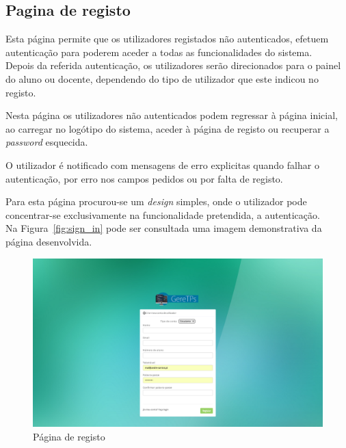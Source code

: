 \subsection{Pagina de registo}

Esta página permite que os utilizadores registados não autenticados, efetuem autenticação para poderem aceder a todas as funcionalidades do sistema.\\

Depois da referida autenticação, os utilizadores serão direcionados para o painel do aluno ou docente, dependendo do tipo de utilizador que este indicou no registo.

Nesta página os utilizadores não autenticados podem regressar à página inicial, ao carregar no logótipo do sistema, aceder à página de registo ou recuperar a \textit{password} esquecida.

O utilizador é notificado com mensagens de erro explicitas quando falhar o autenticação, por erro nos campos pedidos ou por falta de registo.

Para esta página procurou-se um \textit{design} simples, onde o utilizador pode concentrar-se exclusivamente na funcionalidade pretendida, a autenticação.\\

Na Figura~\ref{fig:sign_in} pode ser consultada uma imagem demonstrativa da página desenvolvida.\\

\begin{figure}[H]
  \centering
  \includegraphics[width=1\textwidth,center]{images/implementacao/sign_up}
  \caption{Página de registo}
  \label{fig:sign_up}
\end{figure}
